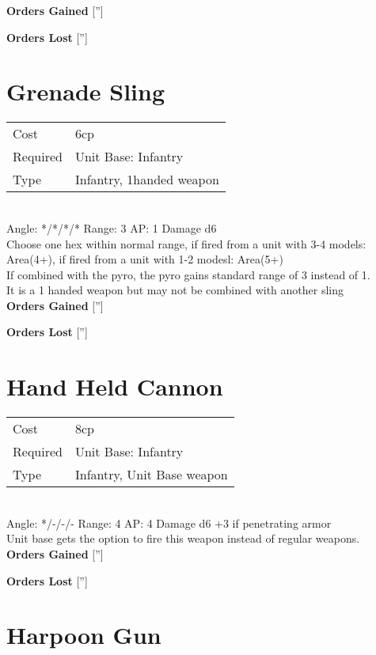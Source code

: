 {\bf Orders Gained}
['']

{\bf Orders Lost}
['']
\section{ Grenade Sling }

\begin{tabular}{ll}
    Cost & 6cp \\
    Required & Unit Base: Infantry\\
    Type & Infantry, 1handed weapon\\
\end{tabular}
\ \\
\indent Angle: */*/*/* Range: 3  AP: 1 Damage d6 \\
Choose one hex within normal range, if fired from a unit with 3-4 models: Area(4+), if fired from a unit with 1-2 modesl: Area(5+) \\ If combined with the pyro, the pyro gains standard range of 3 instead of 1. \\ It is a 1 handed weapon but may not be combined with another sling
\ \\

{\bf Orders Gained}
['']

{\bf Orders Lost}
['']
\section{ Hand Held Cannon }

\begin{tabular}{ll}
    Cost & 8cp \\
    Required & Unit Base: Infantry\\
    Type & Infantry, Unit Base weapon\\
\end{tabular}
\ \\
\indent Angle: */-/-/- Range: 4  AP: 4 Damage d6 +3 if penetrating armor \\
Unit base gets the option to fire this weapon instead of regular weapons. 
\ \\

{\bf Orders Gained}
['']

{\bf Orders Lost}
['']
\section{ Harpoon Gun }

